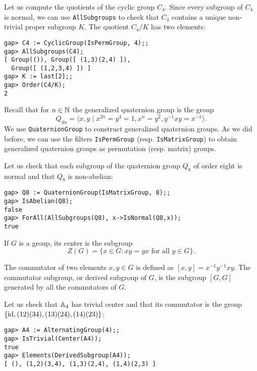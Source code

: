 \begin{example}
Let us compute the quotients of the cyclic group $C_4$. Since every subgroup of
$C_4$ is normal, we can use \lstinline{AllSubgroups} to check that $C_4$
contains a unique non-trivial proper subgroup $K$. The quotient $C_4/K$ has two
elements: 
\begin{lstlisting}
gap> C4 := CyclicGroup(IsPermGroup, 4);;
gap> AllSubgroups(C4);
[ Group(()), Group([ (1,3)(2,4) ]), 
  Group([ (1,2,3,4) ]) ]
gap> K := last[2];;
gap> Order(C4/K);
2
\end{lstlisting}
\end{example}

Recall that for $n\in\mathbb{N}$ the generalized quaternion group is the group 
\[
Q_{4n}=\langle x,y \mid x^{2n} = y^4 = 1, x^n = y^2, y^{-1}xy = x^{-1}\rangle.
\]
We use \lstinline{QuaternionGroup} to construct generalized quaternion groups.
As we did before, we can use the filters \lstinline{IsPermGroup} (resp.
\lstinline{IsMatrixGroup}) to obtain generalized quaternion groups as
permutation (resp. matrix) groups. 

\begin{example}
	Let us check that each subgroup of the quaternion group $Q_8$ of order
	eight is normal and that $Q_8$ is non-abelian: 
\begin{lstlisting}
gap> Q8 := QuaternionGroup(IsMatrixGroup, 8);;                                        
gap> IsAbelian(Q8);
false
gap> ForAll(AllSubgroups(Q8), x->IsNormal(Q8,x));
true
\end{lstlisting}
\end{example}

If $G$ is a group, its center is the subgroup
\[
	Z(G)=\{x\in G:xy=yx\text{ for all $y\in G$}\}.
\]

The commutator of two elements $x,y\in G$ is defined as
$[x,y]=x^{-1}y^{-1}xy$. The commutator subgroup, or derived subgroup of $G$, is the subgroup $[G,G]$
generated by all the commutators of $G$. 

\begin{example}
Let us check that $\mathbb{A}_4$ has trivial center and that its commutator is the group 
$\{\operatorname{id},(12)(34),(13)(24),(14)(23)\}$:
\begin{lstlisting}
gap> A4 := AlternatingGroup(4);;
gap> IsTrivial(Center(A4));
true
gap> Elements(DerivedSubgroup(A4));
[ (), (1,2)(3,4), (1,3)(2,4), (1,4)(2,3) ]
\end{lstlisting}
\end{example}

